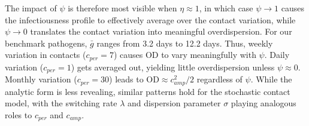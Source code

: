 The impact of $\psi$ is therefore most visible when $\eta \approx 1$, in which case $\psi \rightarrow 1$ causes the infectiousness profile to effectively average over the contact variation, while $\psi \rightarrow 0$ translates the contact variation into meaningful overdispersion.  For our benchmark pathogens, $\bar{g}$ ranges from 3.2 days to 12.2 days. Thus, weekly variation in contacts ($c_{per} = 7$) causes $\text{OD}$ to vary meaningfully with $\psi$. Daily variation ($c_{per} = 1$) gets averaged out, yielding little overdispersion unless $\psi \approx 0$. Monthly variation ($c_{per} = 30$) leads to $\text{OD} \approx c_{amp}^2 / 2$ regardless of $\psi$. While the analytic form is less revealing, similar patterns hold for the stochastic contact model, with the switching rate $\lambda$ and dispersion parameter $\sigma$ playing analogous roles to $c_{per}$ and $c_{amp}$. 




























































